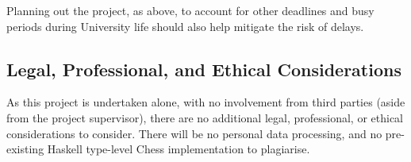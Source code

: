 \documentclass[12pt, a4paper]{scrartcl}
\begin{document}
Planning out the project, as above, to account for other deadlines and busy periods during University life should also help mitigate the risk of delays.

\subsection{Legal, Professional, and Ethical Considerations}

As this project is undertaken alone, with no involvement from third parties (aside from the project supervisor), there are no additional legal, professional, or ethical considerations to consider. There will be no personal data processing, and no pre-existing Haskell type-level Chess implementation to plagiarise.




\end{document}
